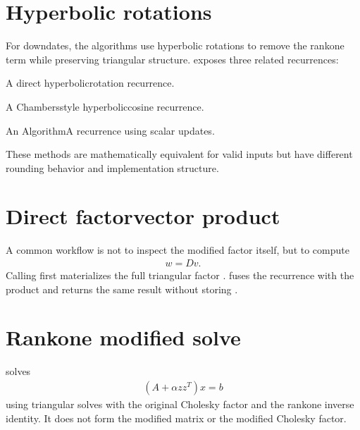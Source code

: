 \documentclass[a4paper,11pt,english]{sphinxmanual}
\begin{document}
\section{Hyperbolic rotations}
\label{\detokenize{algorithms:hyperbolic-rotations}}
\sphinxAtStartPar
For downdates, the algorithms use hyperbolic rotations to remove the rank\sphinxhyphen{}one
term while preserving triangular structure.   exposes three related
recurrences:
\begin{description}
\sphinxAtStartPar
A direct hyperbolic\sphinxhyphen{}rotation recurrence.

\sphinxAtStartPar
A Chambers\sphinxhyphen{}style hyperbolic\sphinxhyphen{}cosine recurrence.

\sphinxAtStartPar
An Algorithm\sphinxhyphen{}A recurrence using scalar  updates.

\end{description}

\sphinxAtStartPar
These methods are mathematically equivalent for valid inputs but have different
rounding behavior and implementation structure.


\section{Direct factor\sphinxhyphen{}vector product}
\label{\detokenize{algorithms:direct-factor-vector-product}}
\sphinxAtStartPar
A common workflow is not to inspect the modified factor itself, but to compute
\begin{equation*}
\begin{split}w = D v.\end{split}
\end{equation*}
\sphinxAtStartPar
Calling  first materializes the full triangular factor
.   fuses the recurrence with the product and
returns the same result without storing .


\section{Rank\sphinxhyphen{}one modified solve}
\label{\detokenize{algorithms:rank-one-modified-solve}}
\sphinxAtStartPar
{} solves
\begin{equation*}
\begin{split}(A + \alpha z z^T) x = b\end{split}
\end{equation*}
\sphinxAtStartPar
using triangular solves with the original Cholesky factor and the rank\sphinxhyphen{}one
inverse identity.  It does not form the modified matrix or the modified
Cholesky factor.
\end{document}
